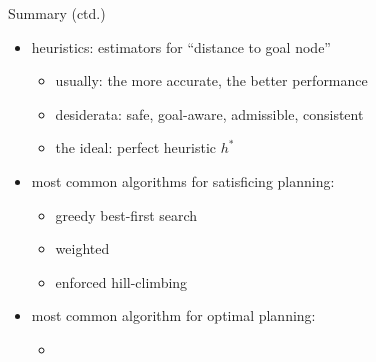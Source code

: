 \documentclass{gkibeamer}
\begin{document}
\begin{frame}{Summary (ctd.)}
  \begin{itemize}
  \item \alert{heuristics:} estimators for ``distance to goal node''
    \begin{itemize}
    \item usually: the more accurate, the better performance
    \item desiderata: \alert{safe}, \alert{goal-aware},
      \alert{admissible}, \alert{consistent}
    \item the ideal: \alert{perfect heuristic $h^*$}
    \end{itemize}
  \item most common algorithms for \alert{satisficing planning}:
    \begin{itemize}
    \item \alert{greedy best-first search}
    \item \alert{weighted \astar}
    \item \alert{enforced hill-climbing}
    \end{itemize}
  \item most common algorithm for \alert{optimal planning}:
    \begin{itemize}
    \item \alert{\astar}
    \end{itemize}
  \end{itemize}
\end{frame}
\end{document}

